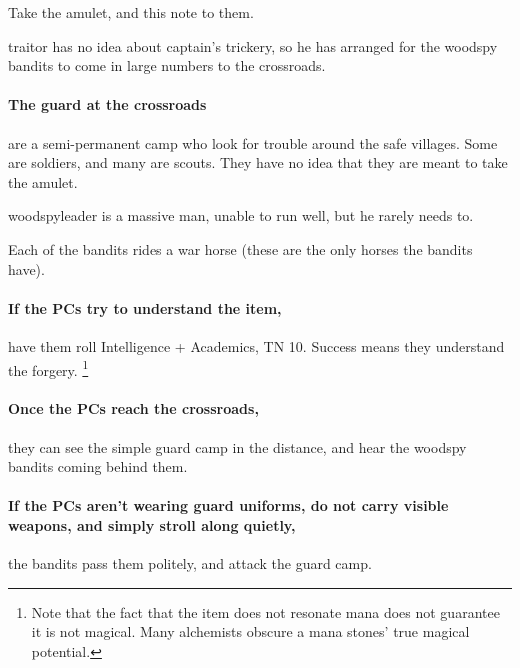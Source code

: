 \begin{multicols}{2}
\begin{speechtext}
  Take the amulet, and this note to them.

\end{speechtext}

\Gls{traitor} has no idea about \gls{captain}'s trickery, so he has arranged for the woodspy bandits to come in large numbers to the crossroads.

\paragraph{The \gls{guard} at the crossroads}
are a semi-permanent camp who look for trouble around the safe villages.
Some are soldiers, and many are scouts.
They have no idea that they are meant to take the amulet.



\woodspyleader

\Gls{woodspyleader} is a massive man, unable to run well, but he rarely needs to.

Each of the bandits rides a war horse (these are the only horses the bandits have).

\paragraph{If the PCs try to understand the item,}
have them roll Intelligence + Academics, TN 10.
Success means they understand the forgery.%
  \footnote{Note that the fact that the item does not resonate mana does not guarantee it is not magical.
  Many alchemists obscure a mana stones' true magical potential.
  \iftoggle{core}{See page \pageref{manaTrick} in the core rules.}{}
}

\paragraph{Once the PCs reach the crossroads,}
they can see the simple \gls{guard} camp in the distance, and hear the woodspy bandits coming behind them.

\paragraph{If the PCs aren't wearing \gls{guard} uniforms, do not carry visible weapons, and simply stroll along quietly,}
the bandits pass them politely, and attack the \gls{guard} camp.


\end{multicols}
